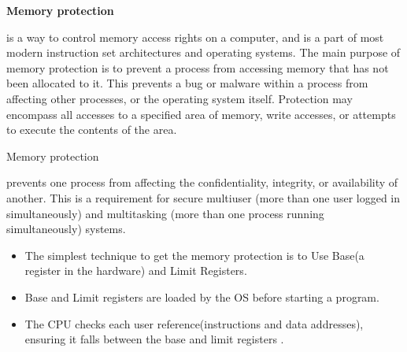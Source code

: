 \documentclass[12pt]{article}
\begin{document}
\begin{adjustwidth}{0.25in}{0.0in}
{\fontsize{18pt}{21.6pt}\selectfont \textbf{Memory protection} {\fontsize{16pt}{19.2pt}\selectfont is a way to control memory access rights on a computer, and is a part of most modern instruction set architectures and operating systems. The main purpose of memory protection is to prevent a process from accessing memory that has not been allocated to it. This prevents a bug or malware within a process from affecting other processes, or the operating system itself. Protection may encompass all accesses to a specified area of memory, write accesses, or attempts to execute the contents of the area.\par}\par}\par

\end{adjustwidth}

\begin{adjustwidth}{0.25in}{0.0in}
{\fontsize{18pt}{21.6pt}\selectfont Memory protection {\fontsize{16pt}{19.2pt}\selectfont prevents one process from affecting the confidentiality, integrity, or availability of another. This is a requirement for secure multiuser (more than one user logged in simultaneously) and multitasking (more than one process running simultaneously) systems.\par}\par}\par

\end{adjustwidth}

\begin{itemize}
	\item {\fontsize{16pt}{19.2pt}\selectfont The simplest technique to get the memory protection is to Use Base(a register in the hardware) and Limit Registers.\par}\par

	\item {\fontsize{16pt}{19.2pt}\selectfont Base and Limit registers are loaded by the OS before starting a program.\par}\par

	\item {\fontsize{16pt}{19.2pt}\selectfont The CPU checks each user reference(instructions and data addresses), ensuring it falls between the base and limit registers .\par}
\end{itemize}\par
\end{document}
